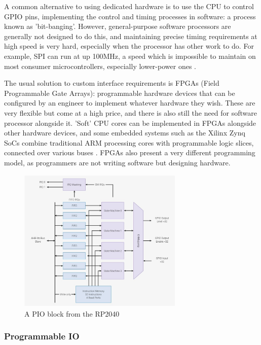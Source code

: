 \documentclass[a4paper,fleqn,12pt]{article}
\begin{document}
A common alternative to using dedicated hardware is to use the CPU to control GPIO pins, implementing the control and timing processes in software: a process known as 'bit-banging'. However, general-purpose software processors are generally not designed to do this, and maintaining precise timing requirements at high speed is very hard, especially when the processor has other work to do. For example, SPI can run at up 100MHz, a speed which is impossible to maintain on most consumer microcontrollers, especially lower-power ones \citep{picosdk}.

The usual solution to custom interface requirements is FPGAs (Field Programmable Gate Arrays): programmable hardware devices that can be configured by an engineer to implement whatever hardware they wish. These are very flexible but come at a high price, and there is also still the need for software processor alongside it. 'Soft' CPU cores can be implemented in FPGAs alongside other hardware devices, and some embedded systems such as the Xilinx Zynq SoCs combine traditional ARM processing cores with programmable logic slices, connected over various buses \citep{zynq}. FPGAs also present a very different programming model, as programmers are not writing software but designing hardware.


\begin{figure}[b!]
	\centering
	\includegraphics[width=0.7\textwidth]{../img/pio-block.jpg}
	\caption{A PIO block from the RP2040 \citep{rp2040}}
	\label{fig:pio-block}
\end{figure}

\subsubsection{Programmable IO}
\end{document}

